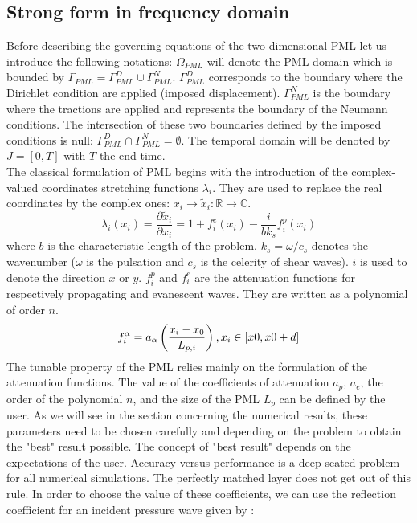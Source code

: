 \subsection{Strong form in frequency domain}
Before describing the governing equations of the two-dimensional PML let us introduce the following notations: $\Omega_{PML}$ will denote the PML domain which is bounded by $\Gamma_{PML} = \Gamma_{PML}^D \cup \Gamma_{PML}^N$. $\Gamma_{PML}^D$ corresponds to the boundary where the Dirichlet condition are applied (imposed displacement). $\Gamma_{PML}^N$ is the boundary where the tractions are applied and represents the boundary of the Neumann conditions. The intersection of these two boundaries defined by the imposed conditions is null: $\Gamma_{PML}^D \cap \Gamma_{PML}^N = \emptyset$. The temporal domain will be denoted by $J = [0,T]$ with $T$ the end time.\\
The classical formulation of PML begins with the introduction of the complex-valued coordinates stretching functions $\lambda_i$. They are used to replace the real coordinates by the complex ones: $x_i \rightarrow \tilde{x}_i: \mathbb{R} \rightarrow \mathbb{C}$.
\begin{equation}
\lambda_i(x_i) = \frac{\partial \tilde{x}_i}{\partial x_i} = 1+f^e_i(x_i)-\frac{i}{b k_s} f^p_i(x_i)
\label{eq:complex-stret-2D}
\end{equation} 
where $b$ is the characteristic length of the problem. $k_s=\omega / c_s$ denotes the wavenumber ($\omega$ is the pulsation and $c_s$ is the celerity of shear waves). $i$ is used to denote the direction $x$ or $y$. $f^p_i$ and $f^e_i$ are the attenuation functions for respectively propagating and evanescent waves. They are written as a polynomial of order $n$. 
\begin{equation}
f^\alpha_i = a_\alpha \left(\frac{x_i - x_0}{L_{p,i}}  \right), x_i \in [x0,x0+d] \\
\label{eq:attenuation-functions}
\end{equation}
The tunable property of the PML relies mainly on the formulation of the attenuation functions. The value of the coefficients of attenuation $a_p$, $a_e$, the order of the polynomial $n$, and the size of the PML $L_p$ can be defined by the user. As we will see in the section concerning the numerical results, these parameters need to be chosen carefully and depending on the problem to obtain the "best" result possible. The concept of "best result" depends on the expectations of the user. Accuracy versus performance is a deep-seated problem for all numerical simulations. The perfectly matched layer does not get out of this rule. In order to choose the value of these coefficients, we can use the reflection coefficient for an incident pressure wave given by \cite{Basu2004}:
